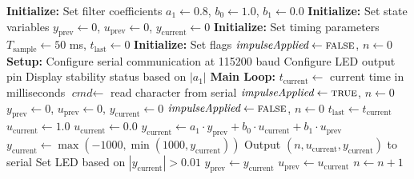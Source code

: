 \begin{algorithm}[H]
\caption{First-Order Digital Filter for Stability Demonstration}
\begin{algorithmic}[1]
\State \textbf{Initialize:} Set filter coefficients $a_1 \gets 0.8$, $b_0 \gets 1.0$, $b_1 \gets 0.0$
\State \textbf{Initialize:} Set state variables $y_{\text{prev}} \gets 0$, $u_{\text{prev}} \gets 0$, $y_{\text{current}} \gets 0$
\State \textbf{Initialize:} Set timing parameters $T_{\text{sample}} \gets 50$ ms, $t_{\text{last}} \gets 0$
\State \textbf{Initialize:} Set flags $\textit{impulseApplied} \gets \textsc{false}$, $n \gets 0$
\State
\State \textbf{Setup:}
\State \hspace{1em} Configure serial communication at 115200 baud
\State \hspace{1em} Configure LED output pin
\State \hspace{1em} Display stability status based on $|a_1|$
\State
\State \textbf{Main Loop:}
    \State $t_{\text{current}} \gets$ current time in milliseconds
    \State
        \State $\textit{cmd} \gets$ read character from serial
            \State $\textit{impulseApplied} \gets \textsc{true}$, $n \gets 0$
            \State $y_{\text{prev}} \gets 0$, $u_{\text{prev}} \gets 0$, $y_{\text{current}} \gets 0$
            \State $\textit{impulseApplied} \gets \textsc{false}$, $n \gets 0$
        \EndIf
    \EndIf
    \State
        \State $t_{\text{last}} \gets t_{\text{current}}$
        \State
        \State {}
            \State $u_{\text{current}} \gets 1.0$
        \Else
            \State $u_{\text{current}} \gets 0.0$
        \EndIf
        \State
        \State {}
        \State $y_{\text{current}} \gets a_1 \cdot y_{\text{prev}} + b_0 \cdot u_{\text{current}} + b_1 \cdot u_{\text{prev}}$
        \State
        \State {}
        \State $y_{\text{current}} \gets \max(-1000, \min(1000, y_{\text{current}}))$
        \State
            \State Output $(n, u_{\text{current}}, y_{\text{current}})$ to serial
            \State Set LED based on $|y_{\text{current}}| > 0.01$
        \EndIf
        \State
        \State {}
        \State $y_{\text{prev}} \gets y_{\text{current}}$
        \State $u_{\text{prev}} \gets u_{\text{current}}$
        \State $n \gets n + 1$
    \EndIf
\EndWhile
\end{algorithmic}
\end{algorithm}

